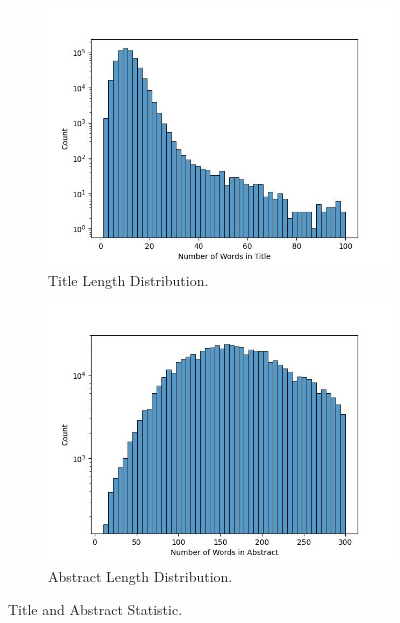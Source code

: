 
\begin{figure}[tp]
  \centering

  \begin{subfigure}{0.45\textwidth}
    \centering
    \includegraphics[width=\textwidth]{figs/data-statistic/title_lens.jpg}
    \caption{Title Length Distribution.}
    \label{fig:subfig1}
  \end{subfigure}
  \hfill
  \begin{subfigure}{0.45\textwidth}
    \centering
    \includegraphics[width=\textwidth]{figs/data-statistic/abstract_lens.jpg}
    \caption{Abstract Length Distribution.}
    \label{fig:subfig2}
  \end{subfigure}

  \caption{Title and Abstract Statistic.}
  \label{fig:title-abstract-statistic}
\end{figure}